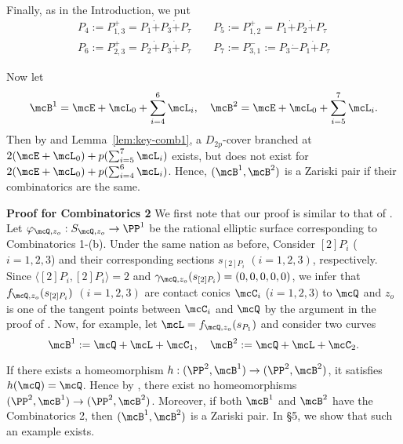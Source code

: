 Finally, as in the Introduction, we put 
\begin{eqnarray*}
P_4:=P_{1,3}^+=P_1\dot+P_3\dot+P_\tau \quad\quad
P_5:=P_{1,2}^+=P_1\dot+P_2\dot+P_\tau\\
P_6:=P_{2,3}^+=P_2\dot+P_3\dot+P_\tau \quad\quad
P_7:=P_{3,1}^-:=P_3\dot-P_1\dot+P_\tau
\end{eqnarray*}


Now let
\[
\mcB^1=\mcE +\mcL_0+\sum_{i=4}^6 \mcL_i, \quad
\mcB^2=\mcE +\mcL_0+\sum_{i=5}^7 \mcL_i.
\]
Then by  \cite[Theorem 3.2]{tokunaga14} and  Lemma~\ref{lem:key-comb1}, a $D_{2p}$-cover branched at $2(\mcE+\mcL_0)+p(\sum_{i=5}^7 \mcL_i)$ exists, but does not exist for $2(\mcE +\mcL_0)+p(\sum_{i=4}^6 \mcL_i)$. Hence, $(\mcB^1, \mcB^2)$  is a Zariski pair
if their combinatorics are the same.
 \bigskip 
%
%
%
%
\bigskip


{\bf Proof for Combinatorics 2}
We first note that our proof is similar to that of \cite[Theorem 5 (ii)]{tokunaga14}. Let $\varphi_{\mcQ, z_o} : S_{\mcQ, z_o} \to \PP^1$
 be the rational elliptic surface corresponding to Combinatorics 1-(b).  Under the same nation as before, Consider $[2]P_i$ ($i = 1, 2,3$)
 and their corresponding sections $s_{[2]P_i}$ $(i = 1, 2, 3)$, respectively. Since $\langle [2]P_i, [2]P_i \rangle = 2$ and
 $\gamma_{\mcQ, z_o}(s_{[2]P_i}) = (0, 0, 0, 0, 0)$,  we infer that $f_{\mcQ, z_o}(s_{[2]P_i})$ $(i = 1, 2, 3)$ are contact conics $\mcC_i$ ($i = 1, 2, 3)$  to
 $\mcQ$ and $z_o$ is one of the tangent points between $\mcC_i$ and $\mcQ$ by the argument in the proof of \cite[Theorem 5 (ii), p. 633]
 {tokunaga14}.  Now, for example, let  $\mcL = f_{\mcQ, z_o}(s_{P_1})$ and consider two curves
 \[
 \mcB^1 := \mcQ + \mcL + \mcC_1, \quad \mcB^2 := \mcQ + \mcL + \mcC_2.
 \]
 
 If there  exists a homeomorphism $h: (\PP^2, \mcB^1) \to (\PP^2, \mcB^2)$, it satisfies $h(\mcQ) = \mcQ$. Hence
 by \cite[Proposition~4.4]{tokunaga14}, there exist no homeomorphisms $(\PP^2, \mcB^1) \to (\PP^2, \mcB^2)$.
 Moreover, if both $\mcB^1$ and $\mcB^2$ have the Combinatorics 2, then $(\mcB^1, \mcB^2)$ is a Zariski pair. In \S 5, we show
 that such an example exists. 
 








      


                                             